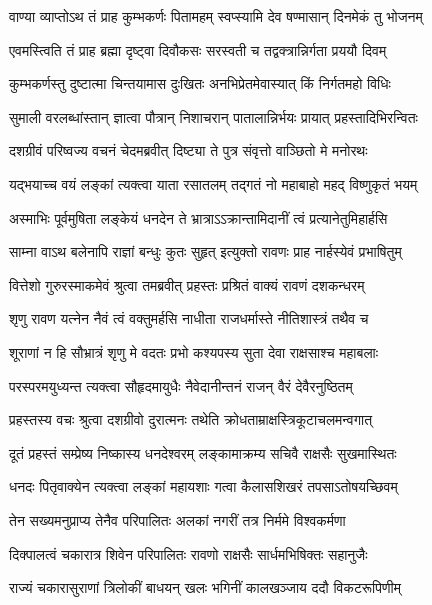 \twolineshloka
{वाण्या व्याप्तोऽथ तं प्राह कुम्भकर्णः पितामहम्}
{स्वप्स्यामि देव षण्मासान् दिनमेकं तु भोजनम्} %

\twolineshloka
{एवमस्त्विति तं प्राह ब्रह्मा दृष्ट्वा दिवौकसः}
{सरस्वती च तद्वक्त्रान्निर्गता प्रययौ दिवम्} %

\twolineshloka
{कुम्भकर्णस्तु दुष्टात्मा चिन्तयामास दुःखितः}
{अनभिप्रेतमेवास्यात् किं निर्गतमहो विधिः} %

\twolineshloka
{सुमाली वरलब्धांस्तान् ज्ञात्वा पौत्रान् निशाचरान्}
{पातालान्निर्भयः प्रायात् प्रहस्तादिभिरन्वितः} %

\twolineshloka
{दशग्रीवं परिष्वज्य वचनं चेदमब्रवीत्}
{दिष्ट्या ते पुत्र संवृत्तो वाञ्छितो मे मनोरथः} %

\twolineshloka
{यद्भयाच्च वयं लङ्कां त्यक्त्वा याता रसातलम्}
{तद्गतं नो महाबाहो महद् विष्णुकृतं भयम्} %

\twolineshloka
{अस्माभिः पूर्वमुषिता लङ्केयं धनदेन ते}
{भ्रात्राऽऽक्रान्तामिदानीं त्वं प्रत्यानेतुमिहार्हसि} %

\twolineshloka
{साम्ना वाऽथ बलेनापि राज्ञां बन्धुः कुतः सुहृत्}
{इत्युक्तो रावणः प्राह नार्हस्येवं प्रभाषितुम्} %

\twolineshloka
{वित्तेशो गुरुरस्माकमेवं श्रुत्वा तमब्रवीत्}
{प्रहस्तः प्रश्रितं वाक्यं रावणं दशकन्धरम्} %

\twolineshloka
{शृणु रावण यत्नेन नैवं त्वं वक्तुमर्हसि}
{नाधीता राजधर्मास्ते नीतिशास्त्रं तथैव च} %

\twolineshloka
{शूराणां न हि सौभ्रात्रं शृणु मे वदतः प्रभो}
{कश्यपस्य सुता देवा राक्षसाश्च महाबलाः} %

\twolineshloka
{परस्परमयुध्यन्त त्यक्त्वा सौहृदमायुधैः}
{नैवेदानीन्तनं राजन् वैरं देवैरनुष्ठितम्} %

\twolineshloka
{प्रहस्तस्य वचः श्रुत्वा दशग्रीवो दुरात्मनः}
{तथेति क्रोधताम्राक्षस्त्रिकूटाचलमन्वगात्} %

\twolineshloka
{दूतं प्रहस्तं सम्प्रेष्य निष्कास्य धनदेश्वरम्}
{लङ्कामाक्रम्य सचिवै राक्षसैः सुखमास्थितः} %

\twolineshloka
{धनदः पितृवाक्येन त्यक्त्वा लङ्कां महायशाः}
{गत्वा कैलासशिखरं तपसाऽतोषयच्छिवम्} %

\twolineshloka
{तेन सख्यमनुप्राप्य तेनैव परिपालितः}
{अलकां नगरीं तत्र निर्ममे विश्वकर्मणा} %

\twolineshloka
{दिक्पालत्वं चकारात्र शिवेन परिपालितः}
{रावणो राक्षसैः सार्धमभिषिक्तः सहानुजैः} %

\twolineshloka
{राज्यं चकारासुराणां त्रिलोकीं बाधयन् खलः}
{भगिनीं कालखञ्जाय ददौ विकटरूपिणीम्} %

